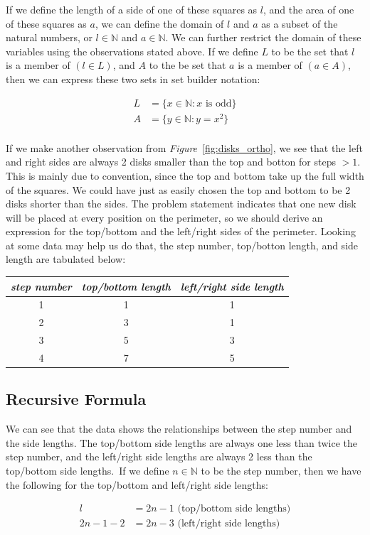 \documentclass[11pt]{article}
\begin{document}
	If we define the length of a side of one of these squares as $l$, and the area of one of these squares as $a$, we can define the domain of $l$ and $a$ as a subset of the 
	natural numbers, or $l\in\mathbb{N}$ and $a\in\mathbb{N}$.  We can further restrict the domain of these variables using the observations stated above.  If we define $L$ to be the set
	that $l$ is a member of $(l\in L)$, and $A$ to the be set that $a$ is a member of $(a\in A)$, then we can express these two sets in set builder notation:

	\begin{align*}
		L&=\{x\in\mathbb{N}:x\text{ is odd}\}\\
		A&=\{y\in\mathbb{N}:y=x^2\}\\
	\end{align*}

	If we make another observation from \emph{Figure}~\ref{fig:disks_ortho}, we see that the left and right sides are always 2 disks smaller than the top and botton for steps $>1$.  
	This is mainly due to convention, since the top and bottom take up the full width of the squares.  We could have just as easily chosen the top and bottom to be 2 disks shorter than the 
 	sides.  The problem statement indicates that one new disk will be placed at every position on the perimeter, so we should derive an expression for the top/bottom and the left/right sides 
	of the perimeter.  Looking at some data may help us do that, the step number, top/botton length, and side length are tabulated below:

	\begin{center}
		\begin{tabular}{|c|c|c|}	\hline\hline
			\emph{step number} &
			\emph{top/bottom length} &
			\emph{left/right side length} \\ \hline
			1	&1	&1 \\
			2	&3	&1 \\
			3	&5	&3 \\
			4	&7	&5 \\ \hline \hline
		\end{tabular}
	\end{center}
	
	\subsection{Recursive Formula}

	We can see that the data shows the relationships between the step number and the side lengths.  The top/bottom side lengths are always one less than twice the step number, and the 
	left/right side lengths are always 2 less than the top/bottom side lengths.\
	If we define $n\in\mathbb{N}$ to be the step number, then we have the following for the top/bottom and left/right side lengths:
	\begin{center}
		\begin{align}
			l&=2n-1 \text{     (top/bottom side lengths)}\\
			2n-1-2&=2n-3 \text{     (left/right side lengths)}
		\end{align}
	\end{center}
\end{document}
